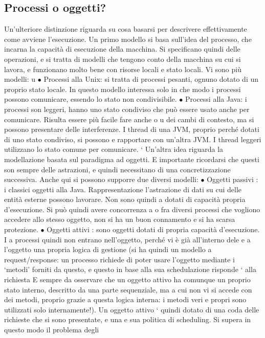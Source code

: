 \subsection{Processi o oggetti?}
Un'ulteriore distinzione riguarda su cosa basarsi per descrivere effettivamente come avviene l'esecuzione.
Un primo modello si basa sull'idea del processo, che incarna la capacità di esecuzione della macchina. Si specificano
quindi delle operazioni, e si tratta di modelli che tengono conto della macchina su cui si lavora, e funzionano molto
bene con risorse locali e stato locali. Vi sono più modelli:
u
$\bullet$ Processi alla Unix: si tratta di processi pesanti, ognuno dotato di un
proprio stato locale. In questo modello interessa solo in che modo i processi
possono comunicare, essendo lo stato non condivisibile.
$\bullet$ Processi alla Java: i processi son leggeri, hanno uno stato condiviso che
può essere usato anche per comunicare. Risulta essere più facile fare anche
o
u
dei cambi di contesto, ma si possono presentare delle interferenze.
I thread di una JVM, proprio perché dotati di uno stato condiviso, si possono
e
rapportare con un'altra JVM. I thread leggeri utilizzano lo stato comune per
comunicare.
`
Un'altra idea riguarda la modellazione basata sul paradigma ad oggetti. E
importante ricordarsi che questi son sempre delle astrazioni, e quindi necessitano
di una concretizzazione successiva. Anche qui si possono supporre due diversi
modelli:
$\bullet$ Oggetti passivi : i classici oggetti alla Java. Rappresentazione l'astrazione
di dati su cui delle entità esterne possono lavorare. Non sono quindi
a
dotati di capacità propria d'esecuzione. Si può quindi avere concorrenza
a
o
fra diversi processi che vogliono accedere allo stesso oggetto, non si ha un
buon connamento e si ha scarsa protezione.
$\bullet$ Oggetti attivi : sono oggetti dotati di propria capacità d'esecuzione. I
a
processi quindi non entrano nell'oggetto, perché vi è già all'interno dele
e a
l'oggetto una propria logica di gestione (si ha quindi un modello a request/response: un processo richiede di poter
usare l'oggetto mediante i
{`}metodi' forniti da questo, e questo in base alla sua schedulazione risponde
`
alla richiesta E sempre da osservare che un oggetto attivo ha comunque
un proprio stato interno, descritto da una parte sequenziale, ma a cui
non vi si accede con dei metodi, proprio grazie a questa logica interna: i
metodi veri e propri sono utilizzati solo internamente!). Un oggetto attivo
` quindi dotato di una coda delle richieste che si sono presentate, e una
e
sua politica di scheduling. Si supera in questo modo il problema degli
